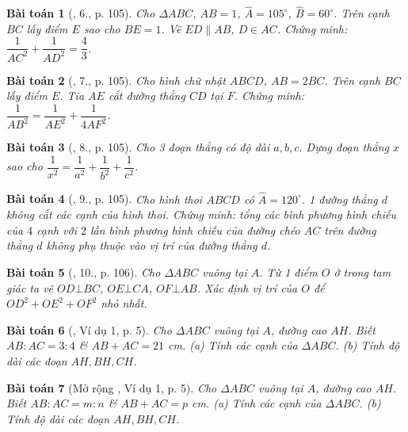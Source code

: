 \documentclass{article}
\newtheorem{baitoan}{Bài toán}
\begin{document}
\begin{baitoan}[\cite{Tuyen_Toan_9}, 6., p. 105]
	Cho $\Delta ABC$, $AB = 1$, $\widehat{A} = 105^\circ$, $\widehat{B} = 60^\circ$. Trên cạnh $BC$ lấy điểm $E$ sao cho $BE = 1$. Vẽ $ED\parallel AB$, $D\in AC$. Chứng minh: $\dfrac{1}{AC^2} + \dfrac{1}{AD^2} = \dfrac{4}{3}$.
\end{baitoan}

\begin{baitoan}[\cite{Tuyen_Toan_9}, 7., p. 105]
	Cho hình chữ nhật $ABCD$, $AB = 2BC$. Trên cạnh $BC$ lấy điểm $E$. Tia $AE$ cắt đường thẳng $CD$ tại $F$. Chứng minh: $\dfrac{1}{AB^2} = \dfrac{1}{AE^2} + \dfrac{1}{4AF^2}$.
\end{baitoan}

\begin{baitoan}[\cite{Tuyen_Toan_9}, 8., p. 105]
	Cho 3 đoạn thẳng có độ dài $a,b,c$. Dựng đoạn thẳng $x$ sao cho $\dfrac{1}{x^2} = \dfrac{1}{a^2} + \dfrac{1}{b^2} + \dfrac{1}{c^2}$.
\end{baitoan}

\begin{baitoan}[\cite{Tuyen_Toan_9}, 9., p. 105]
	Cho hình thoi $ABCD$ có $\widehat{A} = 120^\circ$. 1 đường thẳng $d$ không cắt các cạnh của hình thoi. Chứng minh: tổng các bình phương hình chiếu của $4$ cạnh với $2$ lần bình phương hình chiếu của đường chéo $AC$ trên đường thẳng $d$ không phụ thuộc vào vị trí của đường thẳng $d$.
\end{baitoan}

\begin{baitoan}[\cite{Tuyen_Toan_9}, 10., p. 106]
	Cho $\Delta ABC$ vuông tại $A$. Từ 1 điểm $O$ ở trong tam giác ta vẽ $OD\bot BC$, $OE\bot CA$, $OF\bot AB$. Xác định vị trí của $O$ để $OD^2 + OE^2 + OF^2$ nhỏ nhất.
\end{baitoan}

\begin{baitoan}[\cite{TLCT_THCS_Toan_9_hinh_hoc}, Ví dụ 1, p. 5]
	Cho $\Delta ABC$ vuông tại $A$, đường cao $AH$. Biết $AB:AC = 3:4$ \& $AB + AC = 21$ \emph{cm}. (a) Tính các cạnh của $\Delta ABC$. (b) Tính độ dài các đoạn $AH,BH,CH$.
\end{baitoan}

\begin{baitoan}[Mở rộng \cite{TLCT_THCS_Toan_9_hinh_hoc}, Ví dụ 1, p. 5]
	Cho $\Delta ABC$ vuông tại $A$, đường cao $AH$. Biết $AB:AC = m:n$ \& $AB + AC = p$ \emph{cm}. (a) Tính các cạnh của $\Delta ABC$. (b) Tính độ dài các đoạn $AH,BH,CH$.
\end{baitoan}
\end{document}
